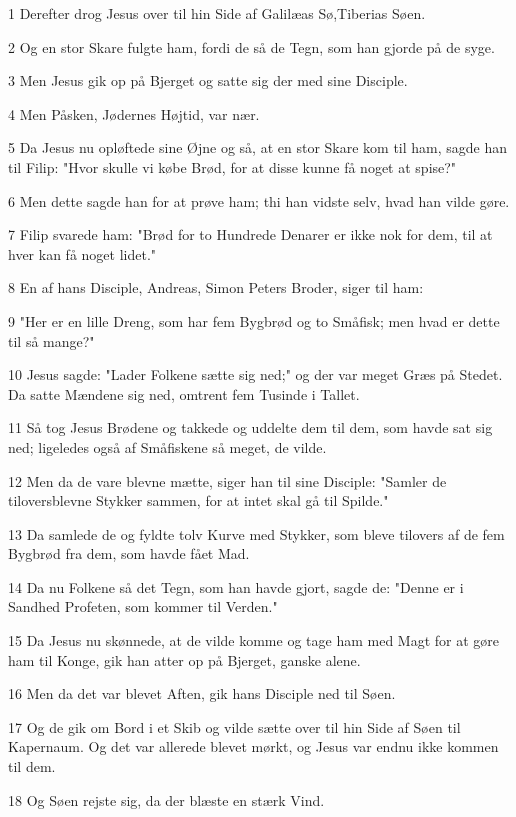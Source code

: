 \par 1 Derefter drog Jesus over til hin Side af Galilæas Sø,Tiberias Søen.
\par 2 Og en stor Skare fulgte ham, fordi de så de Tegn, som han gjorde på de syge.
\par 3 Men Jesus gik op på Bjerget og satte sig der med sine Disciple.
\par 4 Men Påsken, Jødernes Højtid, var nær.
\par 5 Da Jesus nu opløftede sine Øjne og så, at en stor Skare kom til ham, sagde han til Filip: "Hvor skulle vi købe Brød, for at disse kunne få noget at spise?"
\par 6 Men dette sagde han for at prøve ham; thi han vidste selv, hvad han vilde gøre.
\par 7 Filip svarede ham: "Brød for to Hundrede Denarer er ikke nok for dem, til at hver kan få noget lidet."
\par 8 En af hans Disciple, Andreas, Simon Peters Broder, siger til ham:
\par 9 "Her er en lille Dreng, som har fem Bygbrød og to Småfisk; men hvad er dette til så mange?"
\par 10 Jesus sagde: "Lader Folkene sætte sig ned;" og der var meget Græs på Stedet. Da satte Mændene sig ned, omtrent fem Tusinde i Tallet.
\par 11 Så tog Jesus Brødene og takkede og uddelte dem til dem, som havde sat sig ned; ligeledes også af Småfiskene så meget, de vilde.
\par 12 Men da de vare blevne mætte, siger han til sine Disciple: "Samler de tiloversblevne Stykker sammen, for at intet skal gå til Spilde."
\par 13 Da samlede de og fyldte tolv Kurve med Stykker, som bleve tilovers af de fem Bygbrød fra dem, som havde fået Mad.
\par 14 Da nu Folkene så det Tegn, som han havde gjort, sagde de: "Denne er i Sandhed Profeten, som kommer til Verden."
\par 15 Da Jesus nu skønnede, at de vilde komme og tage ham med Magt for at gøre ham til Konge, gik han atter op på Bjerget, ganske alene.
\par 16 Men da det var blevet Aften, gik hans Disciple ned til Søen.
\par 17 Og de gik om Bord i et Skib og vilde sætte over til hin Side af Søen til Kapernaum. Og det var allerede blevet mørkt, og Jesus var endnu ikke kommen til dem.
\par 18 Og Søen rejste sig, da der blæste en stærk Vind.
